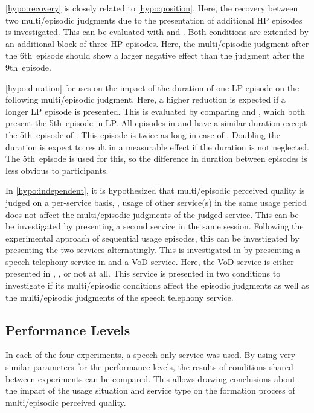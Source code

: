 \autoref{hypo:recovery} is closely related to \autoref{hypo:position}.
Here, the recovery between two multi\-/episodic judgments due to the presentation of additional \ac{HP} episodes is investigated.
This can be evaluated with \CVb{} and .
Both conditions are extended by an additional block of three \ac{HP} episodes.
Here, the multi\-/episodic judgment after the 6th~episode should show a larger negative effect than the judgment after the 9th~episode.

\autoref{hypo:duration} focuses on the impact of the duration of one \ac{LP} episode on the following multi\-/episodic judgment.
Here, a higher reduction is expected if a longer \ac{LP} episode is presented.
This is evaluated by comparing \CIIa{} and \CIIb{}, which both present the 5th~episode in \ac{LP}.
All episodes in \CIIa{} and \CIIb{} have a similar duration except the 5th~episode of \CIIb{}.
This episode is twice as long in case of \CIIb{}.
Doubling the duration is expect to result in a measurable effect if the duration is not neglected.
The 5th~episode is used for this, so the difference in duration between episodes is less obvious to participants.

In \autoref{hypo:independent}, it is hypothesized that multi\-/episodic perceived quality is judged on a per-service basis, \ie, usage of other service(s) in the same usage period does not affect the multi\-/episodic judgments of the judged service.
This can be be investigated by presenting a second service in the same session.
Following the experimental approach of sequential usage episodes, this can be investigated by presenting the two services alternatingly.
This is investigated in \EIIb{} by presenting a speech telephony service in  and a \ac{VoD} service.
Here, the \ac{VoD} service is either presented in , , or not at all.
This service is presented in two conditions to investigate if its multi\-/episodic conditions affect the episodic judgments as well as the multi\-/episodic judgments of the speech telephony service.

\subsection{Performance Levels}
In each of the four experiments, a speech-only service was used.
By using very similar parameters for the performance levels, the results of conditions shared between experiments can be compared.
This allows drawing conclusions about the impact of the usage situation and service type on the formation process of multi\-/episodic perceived quality.

